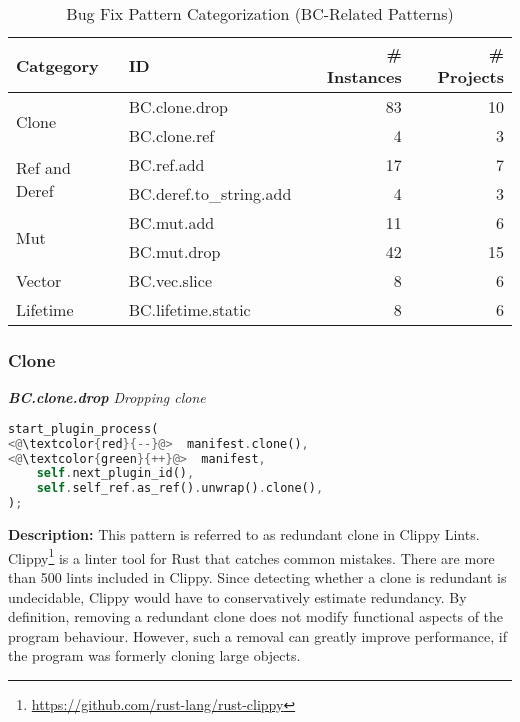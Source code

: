 \begin{table}[]
\begin{tabular}{l|l|r|r}
\textbf{Catgegory} & \textbf{ID} & \textbf{\# Instances} & \textbf{\# Projects} \\
\hline
\multirow{2}{*}{Clone}                                         & BC.clone.drop & 83 & 10 \\
& BC.clone.ref & 4 & 3   
\\\cline{1-4}
\multirow{2}{*}{Ref and Deref} & BC.ref.add & 17 & 7 \\
& BC.deref.to\_string.add  & 4 & 3                                            \\\cline{1-4}
\multirow{2}{*}{Mut} & BC.mut.add  & 11 & 6 \\
& BC.mut.drop  & 42 & 15                               \\\cline{1-4}
Vector & BC.vec.slice  & 8 & 6                                    \\\cline{1-4}
\multirow{1}{*}{Lifetime}      
& BC.lifetime.static  & 8 & 6
\\
\end{tabular}
\caption{\label{table:bc}Bug Fix Pattern Categorization (BC-Related Patterns)}
\end{table}
    

\subsubsection{Clone}

\noindent\textit{\textbf{BC.clone.drop} Dropping clone}

\begin{lstlisting}[language=Rust, style=colouredRust]
start_plugin_process(
<@\textcolor{red}{--}@>  manifest.clone(),
<@\textcolor{green}{++}@>  manifest,
    self.next_plugin_id(),
    self.self_ref.as_ref().unwrap().clone(),
);
\end{lstlisting}

\noindent\textbf{Description:} This pattern is referred to as redundant clone in Clippy Lints. Clippy\footnote{\url{https://github.com/rust-lang/rust-clippy}} is a linter tool for Rust that catches common mistakes. There are more than 500 lints included in Clippy. Since detecting whether a clone is redundant is undecidable, Clippy would have to conservatively estimate redundancy. By definition, removing a redundant clone does not modify functional aspects of the program behaviour. However, such a removal can greatly improve performance, if the program was formerly cloning large objects. \\

